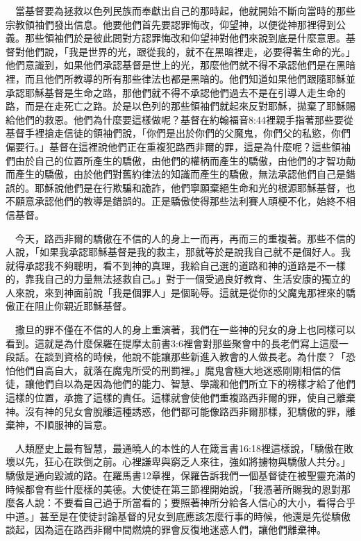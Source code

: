\documentclass{book}
\begin{document}
　當基督要為拯救以色列民族而奉獻出自己的那時起，他就開始不斷向當時的那些宗教領袖們發出信息。他要他們首先要認罪悔改，仰望神，以便從神那裡得到公義。那些領袖們於是彼此問對方認罪悔改和仰望神對他們來說到底是什麼意思。基督對他們說，「我是世界的光，跟從我的，就不在黑暗裡走，必要得著生命的光。」他們意識到，如果他們承認基督是世上的光，那麼他們就不得不承認他們是在黑暗裡，而且他們所教導的所有那些律法也都是黑暗的。他們知道如果他們跟隨耶穌並承認耶穌基督是生命之路，那他們就不得不承認他們過去不是在引導人走生命的路，而是在走死亡之路。於是以色列的那些領袖們就起來反對耶穌，拋棄了耶穌賜給他們的救恩。他們為什麼要這樣做呢？基督在約翰福音8:44裡親手指著那些要從基督手裡搶走信徒的領袖們說，「你們是出於你們的父魔鬼，你們父的私慾，你們偏要行。」基督在這裡說他們正在重複犯路西非爾的罪，這是為什麼呢？這些領袖們由於自己的位置所產生的驕傲，由他們的權柄而產生的驕傲，由他們的才智功勣而產生的驕傲，由於他們對舊約律法的知識而產生的驕傲，無法承認他們自己是錯誤的。耶穌說他們是在行欺騙和詭詐，他們寧願棄絕生命和光的根源耶穌基督，也不願意承認他們的教導是錯誤的。正是驕傲使得那些法利賽人頑梗不化，始終不相信基督。

　今天，路西非爾的驕傲在不信的人的身上一而再，再而三的重複著。那些不信的人說，「如果我承認耶穌基督是我的救主，那就等於是說我自己就不是個好人。我就得承認我不夠聰明，看不到神的真理，我給自己選的道路和神的道路是不一樣的，靠我自己的力量無法拯救自己。」對于一個受過良好教育、生活安康的獨立的人來說，來到神面前說「我是個罪人」是個恥辱。這就是從你的父魔鬼那裡來的驕傲正在阻止你親近耶穌基督。

　撒旦的罪不僅在不信的人的身上重演著，我們在一些神的兒女的身上也同樣可以看到。這就是為什麼保羅在提摩太前書3:6裡會對那些聚會中的長老們寫上這麼一段話。在談到資格的時候，他說不能讓那些新進入教會的人做長老。為什麼？「恐怕他們自高自大，就落在魔鬼所受的刑罰裡。」魔鬼會極大地迷惑剛剛相信的信徒，讓他們自以為是因為他們的能力、智慧、學識和他們所立下的榜樣才給了他們這樣的位置，承擔了這樣的責任。這樣就會使他們重複路西非爾的罪，使自己離棄神。沒有神的兒女會脫離這種誘惑，他們都可能像路西非爾那樣，犯驕傲的罪，離棄神，不順服神的旨意。

　人類歷史上最有智慧，最通曉人的本性的人在箴言書16:18裡這樣說，「驕傲在敗壞以先，狂心在跌倒之前。心裡謙卑與窮乏人來往，強如將擄物與驕傲人共分。」驕傲是通向毀滅的路。在羅馬書12章裡，保羅告訴我們一個基督徒在被聖靈充滿的時候都會有些什麼樣的美德。大使徒在第三節裡開始說，「我憑著所賜我的恩對那麼各人說：不要看自己過于所當看的；要照著神所分給各人信心的大小，看得合乎中道。」甚至是在使徒討論基督的兒女到底應該怎麼行事的時候，他還是先從驕傲談起，因為這在路西非爾中間燃燒的罪會反復地迷惑人們，讓他們離棄神。
\end{document}
